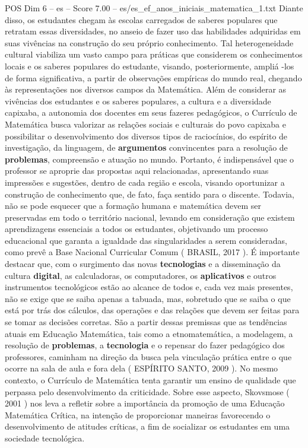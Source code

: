 \begin{textsample}{POS Dim 6 – es – Score 7.00 – es/es\_ef\_anos\_iniciais\_matematica\_1.txt}
Diante disso, os estudantes chegam às escolas carregados de saberes populares que retratam essas diversidades, no anseio de fazer uso das habilidades adquiridas em suas vivências na construção do seu próprio conhecimento.
Tal heterogeneidade cultural viabiliza um vasto campo para práticas que considerem os conhecimentos locais e os saberes populares do estudante, visando, posteriormente, ampliá -los de forma significativa, a partir de observações empíricas do mundo real, chegando às representações nos diversos campos da Matemática.
Além de considerar as vivências dos estudantes e os saberes populares, a cultura e a diversidade capixaba, a autonomia dos docentes em seus fazeres pedagógicos, o Currículo de Matemática busca valorizar as relações sociais e culturais do povo capixaba e possibilitar o desenvolvimento dos diversos tipos de raciocínios, do espírito de investigação, da linguagem, de \textbf{argumentos} convincentes para a resolução de \textbf{problemas}, compreensão e atuação no mundo.
Portanto, é indispensável que o professor se aproprie das propostas aqui relacionadas, apresentando suas impressões e sugestões, dentro de cada região e escola, visando oportunizar a construção de conhecimento que, de fato, faça sentido para o discente.
Todavia, não se pode esquecer que a formação humana e matemática devem ser preservadas em todo o território nacional, levando em consideração que existem aprendizagens essenciais a todos os estudantes, objetivando um processo educacional que garanta a igualdade das singularidades a serem consideradas, como prevê a Base Nacional Curricular Comum ( BRASIL, 2017 ).
É importante destacar que, com o surgimento das novas \textbf{tecnologias} e a disseminação da cultura \textbf{digital}, as calculadoras, os computadores, os \textbf{aplicativos} e outros instrumentos tecnológicos estão ao alcance de todos e, cada vez mais presentes, não se exige que se saiba apenas a tabuada, mas, sobretudo que se saiba o que está por trás dos cálculos, das operações e das relações que devem ser feitas para se tomar as decisões corretas.
São a partir dessas premissas que as tendências atuais em Educação Matemática, tais como a etnomatemática, a modelagem, a resolução de \textbf{problemas}, a \textbf{tecnologia} e o repensar do fazer pedagógico dos professores, caminham na direção da busca pela vinculação prática entre o que ocorre na sala de aula e fora dela ( ESPÍRITO SANTO, 2009 ).
No mesmo contexto, o Currículo de Matemática tenta garantir um ensino de qualidade que perpassa pelo desenvolvimento da criticidade.
Sobre esse aspecto, Skovsmose ( 2001 ) nos leva a refletir sobre a importância da promoção de uma Educação Matemática Crítica, na intenção de proporcionar maneiras favorecendo o desenvolvimento de atitudes críticas, a fim de socializar os estudantes em uma sociedade tecnológica.

\end{textsample}
